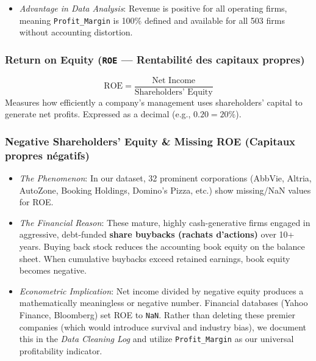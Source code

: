 \documentclass[
]{article}
\providecommand{\tightlist}{%
  \setlength{\itemsep}{0pt}\setlength{\parskip}{0pt}}
\begin{document}
\begin{itemize}
\tightlist
\item
  \emph{Advantage in Data Analysis}: Revenue is positive for all
  operating firms, meaning \texttt{Profit\_Margin} is 100\% defined and
  available for all 503 firms without accounting distortion.
\end{itemize}

\subsubsection{\texorpdfstring{Return on Equity (\texttt{ROE} ---
Rentabilité des capitaux
propres)}{Return on Equity (ROE --- Rentabilité des capitaux propres)}}\label{return-on-equity-roe-rentabilituxe9-des-capitaux-propres}

\[\text{ROE} = \frac{\text{Net Income}}{\text{Shareholders' Equity}}\]
Measures how efficiently a company's management uses shareholders'
capital to generate net profits. Expressed as a decimal (e.g.,
\(0.20 = 20\%\)).

\subsubsection{Negative Shareholders' Equity \& Missing ROE (Capitaux
propres
négatifs)}\label{negative-shareholders-equity-missing-roe-capitaux-propres-nuxe9gatifs}

\begin{itemize}
\tightlist
\item
  \emph{The Phenomenon}: In our dataset, 32 prominent corporations
  (AbbVie, Altria, AutoZone, Booking Holdings, Domino's Pizza, etc.)
  show missing/NaN values for ROE.
\item
  \emph{The Financial Reason}: These mature, highly cash-generative
  firms engaged in aggressive, debt-funded \textbf{share buybacks
  (rachats d'actions)} over 10+ years. Buying back stock reduces the
  accounting book equity on the balance sheet. When cumulative buybacks
  exceed retained earnings, book equity becomes negative.
\item
  \emph{Econometric Implication}: Net income divided by negative equity
  produces a mathematically meaningless or negative number. Financial
  databases (Yahoo Finance, Bloomberg) set ROE to \texttt{NaN}. Rather
  than deleting these premier companies (which would introduce survival
  and industry bias), we document this in the \emph{Data Cleaning Log}
  and utilize \texttt{Profit\_Margin} as our universal profitability
  indicator.
\end{itemize}
\end{document}
